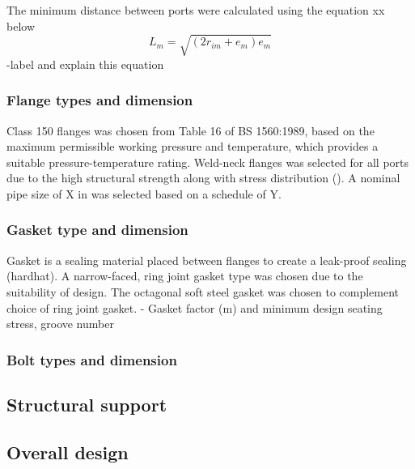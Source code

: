 The minimum distance between ports were calculated using the equation xx below
\begin{equation}
    L_m = \sqrt{(2r_{im}+e_{m})e_m}
\end{equation}
-label and explain this equation

\subsubsection{Flange types and dimension}
Class 150 flanges was chosen from Table 16 of BS 1560:1989, based on the maximum permissible working pressure and temperature, which provides a suitable pressure-temperature rating. Weld-neck flanges was selected for all ports due to the high structural strength along with stress distribution ().
A nominal pipe size of X in was selected based on a schedule of Y. 
\subsubsection{Gasket type and dimension}
Gasket is a sealing material placed between flanges to create a leak-proof sealing (hardhat). A narrow-faced, ring joint gasket type was chosen due to the suitability of design. The octagonal soft steel gasket was chosen to complement choice of ring joint gasket. 
- Gasket factor (m) and minimum design seating stress, groove number

\subsubsection{Bolt types and dimension}
\subsection{Structural support}
\subsection{Overall design}

